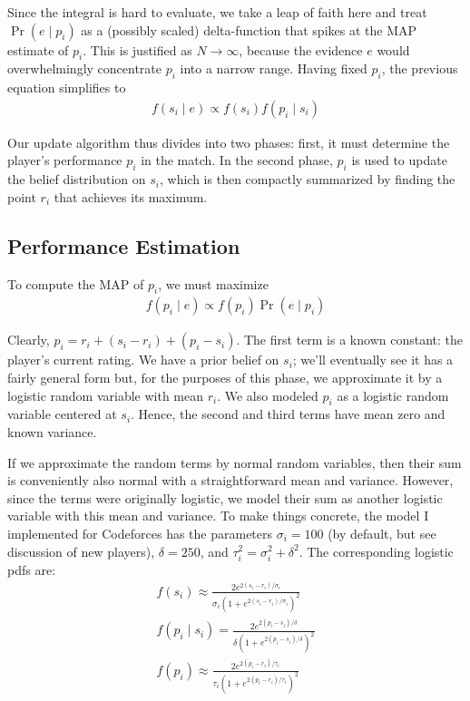 \documentclass{article}
\begin{document}
Since the integral is hard to evaluate, we take a leap of faith here and treat $\Pr(e\mid p_i)$ as a (possibly scaled) delta-function that spikes at the MAP estimate of $p_i$. This is justified as $N \rightarrow \infty$, because the evidence $e$ would overwhelmingly concentrate $p_i$ into a narrow range. Having fixed $p_i$, the previous equation simplifies to
\begin{align}
f(s_i\mid e) \propto f(s_i)f(p_i\mid s_i)
\end{align}

Our update algorithm thus divides into two phases: first, it must determine the player's performance $p_i$ in the match. In the second phase, $p_i$ is used to update the belief distribution on $s_i$, which is then compactly summarized by finding the point $r_i$ that achieves its maximum.

\subsection{Performance Estimation}

To compute the MAP of $p_i$, we must maximize
\begin{align}
f(p_i\mid e) \propto f(p_i) \Pr(e\mid p_i)
\end{align}

Clearly, $p_i = r_i + (s_i-r_i) + (p_i-s_i)$. The first term is a known constant: the player's current rating. We have a prior belief on $s_i$; we'll eventually see it has a fairly general form but, for the purposes of this phase, we approximate it by a logistic random variable with mean $r_i$. We also modeled $p_i$ as a logistic random variable centered at $s_i$. Hence, the second and third terms have mean zero and known variance.

If we approximate the random terms by normal random variables, then their sum is conveniently also normal with a straightforward mean and variance. However, since the terms were originally logistic, we model their sum as another logistic variable with this mean and variance. To make things concrete, the model I implemented for Codeforces has the parameters $\sigma_i = 100$ (by default, but see discussion of new players), $\delta = 250$, and $\tau_i^2 = \sigma_i^2 + \delta^2$. The corresponding logistic pdfs are:
\begin{align}
f(s_i) \approx \frac { 2e^{2(s_i-r_i)/\sigma_i} } { \sigma_i\left(1 + e^{2(s_i-r_i)/\sigma_i} \right)^2 }
\\f(p_i\mid s_i) = \frac { 2e^{2(p_i-s_i)/\delta} } { \delta\left(1 + e^{2(p_i-s_i)/\delta} \right)^2}
\\f(p_i) \approx \frac { 2e^{2(p_i-r_i)/\tau_i} } { \tau_i\left(1 + e^{2(p_i-r_i)/\tau_i} \right)^2}
\end{align}
\end{document}
